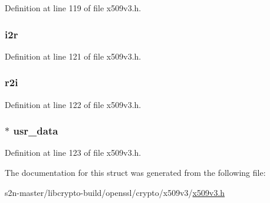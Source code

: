 Definition at line 119 of file x509v3.\+h.

\subsubsection[{\texorpdfstring{i2r}{i2r}}]{ i2r}\hypertarget{structv3__ext__method_a8458cecc6f870ba211a439931ec3b36a}{}\label{structv3__ext__method_a8458cecc6f870ba211a439931ec3b36a}


Definition at line 121 of file x509v3.\+h.

\subsubsection[{\texorpdfstring{r2i}{r2i}}]{ r2i}\hypertarget{structv3__ext__method_aa9e99f9ecfd8f166c97a8110e200d37d}{}\label{structv3__ext__method_aa9e99f9ecfd8f166c97a8110e200d37d}


Definition at line 122 of file x509v3.\+h.

\subsubsection[{\texorpdfstring{usr\+\_\+data}{usr_data}}]{ $\ast$ usr\+\_\+data}\hypertarget{structv3__ext__method_a95a5cb4558ce78c8ea8f0ca4209945f8}{}\label{structv3__ext__method_a95a5cb4558ce78c8ea8f0ca4209945f8}


Definition at line 123 of file x509v3.\+h.



The documentation for this struct was generated from the following file\+:\begin{DoxyCompactItemize}
\item 
s2n-\/master/libcrypto-\/build/openssl/crypto/x509v3/\hyperlink{crypto_2x509v3_2x509v3_8h}{x509v3.\+h}\end{DoxyCompactItemize}
